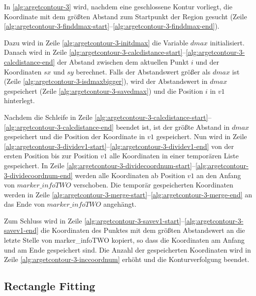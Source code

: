 In \autoref{alg:argetcontour-3} wird, nachdem eine geschlossene Kontur vorliegt, die Koordinate mit dem größten Abstand
 zum Startpunkt der Region gesucht (Zeile
 \ref{alg:argetcontour-3-finddmax-start}--\ref{alg:argetcontour-3-finddmax-end}).



Dazu wird in Zeile \ref{alg:argetcontour-3-initdmax} die Variable $\mathit{dmax}$ initialisiert. Danach wird in Zeile
 \ref{alg:argetcontour-3-calcdistance-start}--\ref{alg:argetcontour-3-calcdistance-end} der Abstand zwischen dem
 aktuellen Punkt $i$ und der Koordinaten $\mathit{sx}$ und $\mathit{sy}$ berechnet. Falls der Abstandswert größer als
 $\mathit{dmax}$ ist (Zeile \ref{alg:argetcontour-3-isdmaxbigger}), wird der Abstandswert in $\mathit{dmax}$
 gespeichert (Zeile \ref{alg:argetcontour-3-savedmax}) und die Position $i$ in $\mathit{v1}$ hinterlegt.

Nachdem die Schleife in Zeile \ref{alg:argetcontour-3-calcdistance-start}--\ref{alg:argetcontour-3-calcdistance-end}
 beendet ist, ist der größte Abstand in $\mathit{dmax}$ gespeichert und die Position der Koordinate in $\mathit{v1}$
 gespeichert. Nun wird in Zeile \ref{alg:argetcontour-3-dividev1-start}--\ref{alg:argetcontour-3-dividev1-end} von der
 ersten Position bis zur Position $\mathit{v1}$ alle Koordinaten in einer temporären Liste gespeichert. In Zeile
 \ref{alg:argetcontour-3-dividecoordnum-start}--\ref{alg:argetcontour-3-dividecoordnum-end} werden alle Koordinaten ab
 Position $\mathit{v1}$ an den Anfang von $\mathit{marker\_infoTWO}$ verschoben. Die temporär gespeicherten Koordinaten
 werden in Zeile \ref{alg:argetcontour-3-merge-start}--\ref{alg:argetcontour-3-merge-end} an das Ende von
 $\mathit{marker\_infoTWO}$ angehängt.

Zum Schluss wird in Zeile \ref{alg:argetcontour-3-savev1-start}--\ref{alg:argetcontour-3-savev1-end} die Koordinaten
 des Punktes mit dem größten Abstandswert an die letzte Stelle von marker\_infoTWO kopiert, so dass die Koordinaten am
 Anfang und am Ende gespeichert sind. Die Anzahl der gespeicherten Koordinaten wird in Zeile
 \ref{alg:argetcontour-3-inccoordnum} erhöht und die Konturverfolgung beendet.


\clearpage

\subsection{Rectangle Fitting} %
\label{sec:rectangle_fitting}



